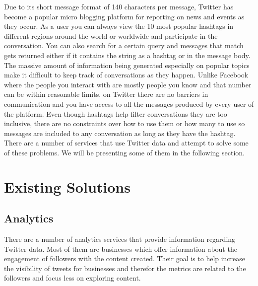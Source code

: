 Due to its short message format of 140 characters per message, Twitter has become a popular micro blogging platform for reporting on news and events as they occur.
As a user you can always view the 10 most popular hashtags in different regions around the world or worldwide and participate in the conversation. You can also search for a certain query and messages that match gets returned either if it contains the string as a hashtag or in the message body.
\newline
The massive amount of information being generated especially on popular topics make it difficult to keep track of conversations as they happen. Unlike Facebook where the people you interact with are mostly people you know and that number can be within reasonable limits, on Twitter there are no barriers in communication and you have access to all the messages produced by every user of the platform. Even though hashtags help filter conversations they are too inclusive, there are no constraints over how to use them or how many to use so messages are included to any conversation as long as they have the hashtag.
\newline
There are a number of services that use Twitter data and attempt to solve some of these problems. We will be presenting some of them in the following section.

\section{Existing Solutions}
\label{sec:ES}

\subsection{Analytics}
\label{sub-sec:analytics}

There are a number of analytics services that provide information regarding Twitter data. Most of them are businesses which offer information about the engagement of followers with the content created. Their goal is to help increase the visibility of tweets for businesses and therefor the metrics are related to the followers and focus less on exploring content. 




